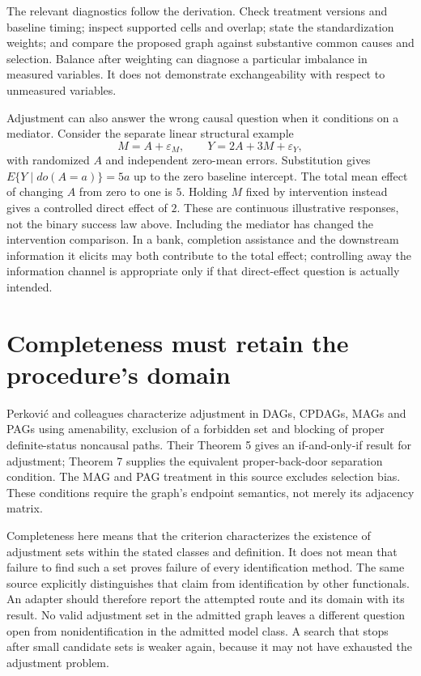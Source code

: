 The relevant diagnostics follow the derivation. Check treatment versions
and baseline timing; inspect supported cells and overlap; state the
standardization weights; and compare the proposed graph against substantive
common causes and selection. Balance after weighting can diagnose a
particular imbalance in measured variables. It does not demonstrate
exchangeability with respect to unmeasured variables.

Adjustment can also answer the wrong causal question when it conditions
on a mediator. Consider the separate linear structural example
\[
 M=A+\varepsilon_M,\qquad
 Y=2A+3M+\varepsilon_Y,
\]
with randomized $A$ and independent zero-mean errors. Substitution gives
$E\{Y\mid do(A=a)\}=5a$ up to the zero baseline intercept. The total
mean effect of changing $A$ from zero to one is $5$. Holding $M$ fixed
by intervention instead gives a controlled direct effect of $2$.
These are continuous illustrative responses, not the binary success law
above. Including the mediator has changed the intervention comparison.
In a bank, completion assistance and the downstream information it
elicits may both contribute to the total effect; controlling away the
information channel is appropriate only if that direct-effect question
is actually intended.~\citep{exec17_s3_exact,pearl2009}

\section{Completeness must retain the procedure's domain}

Perkovi\'c and colleagues characterize adjustment in DAGs, CPDAGs,
MAGs and PAGs using amenability, exclusion of a forbidden set and blocking
of proper definite-status noncausal paths. Their Theorem 5 gives an
if-and-only-if result for adjustment; Theorem 7 supplies the equivalent
proper-back-door separation condition. The MAG and PAG treatment in this
source excludes selection bias. These conditions require the graph's
endpoint semantics, not merely its adjacency
matrix.~\citep{perkovic2018}

Completeness here means that the criterion characterizes the existence
of adjustment sets within the stated classes and definition. It does
not mean that failure to find such a set proves failure of every
identification method. The same source explicitly distinguishes that
claim from identification by other functionals. An adapter should
therefore report the attempted route and its domain with its result.
No valid adjustment set in the admitted graph leaves a different
question open from nonidentification in the admitted model class.
A search that stops after small candidate sets is weaker again,
because it may not have exhausted the adjustment
problem.~\citep{perkovic2018}

